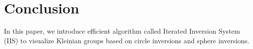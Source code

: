 
\section{Conclusion}

In this paper, we introduce efficient algorithm 
called Iterated Inversion System (IIS) to visualize Kleinian
groups based on circle inversions and sphere inversions.
